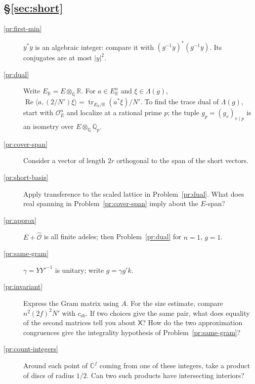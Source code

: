 \documentclass[reqno]{amsart}
\theoremstyle{definition}
\theoremstyle{plain}
\theoremstyle{remark}
\newcommand{\Q}{\mathbb{Q}}
\newcommand{\R}{\mathbb{R}}
\newcommand{\C}{\mathbb{C}}
\newcommand{\Oc}{\mathcal{O}}
\newcommand{\Oh}{\hat{\mathcal{O}}}
\newcommand{\tr}{\operatorname{tr}}
\newcommand{\csb}{c_{\mathrm{sb}}}
\begin{document}
\subsection*{\S\ref{sec:short}}
\begin{description}
\item[\ref{pr:first-min}] \(y^*y\) is an algebraic integer: compare it with \((g^{-1}y)^*(g^{-1}y)\).  Its conjugates are at most \(\lvert y\rvert^2\).
\item[\ref{pr:dual}] Write \(E_\R=E\otimes_\Q\R\).  For \(a\in E_\R^n\) and \(\xi\in\Lambda(g)\), \(\operatorname{Re}\langle a,(2/N')\xi\rangle=\tr_{E_\R/\R}(a^*\xi)/N'\).  To find the trace dual of \(\Lambda(g)\), start with \(\Oc_E^n\) and localize at a rational prime \(p\); the tuple \(g_p=(g_v)_{v\mid p}\) is an isometry over \(E\otimes_\Q\Q_p\).
\item[\ref{pr:cover-span}] Consider a vector of length \(2r\) orthogonal to the span of the short vectors.
\item[\ref{pr:short-basis}] Apply transference to the scaled lattice in Problem~\ref{pr:dual}.  What does real spanning in Problem~\ref{pr:cover-span} imply about the \(E\)-span?
\item[\ref{pr:approx}] \(E+\Oh\) is all finite adeles; then Problem~\ref{pr:dual} for \(n=1\), \(g=1\).
\item[\ref{pr:same-gram}] \(\gamma=YY'^{-1}\) is unitary; write \(g=\gamma g'k\).
\item[\ref{pr:invariant}] Express the Gram matrix using \(A\).  For the size estimate, compare \(n^2(2f)^2N'\) with \(\csb\).  If two choices give the same pair, what does equality of the second matrices tell you about \(\mathsf X\)?  How do the two approximation congruences give the integrality hypothesis of Problem~\ref{pr:same-gram}?
\item[\ref{pr:count-integers}] Around each point of \(\C^f\) coming from one of these integers, take a product of discs of radius \(1/2\).  Can two such products have intersecting interiors?
\end{description}
\end{document}
